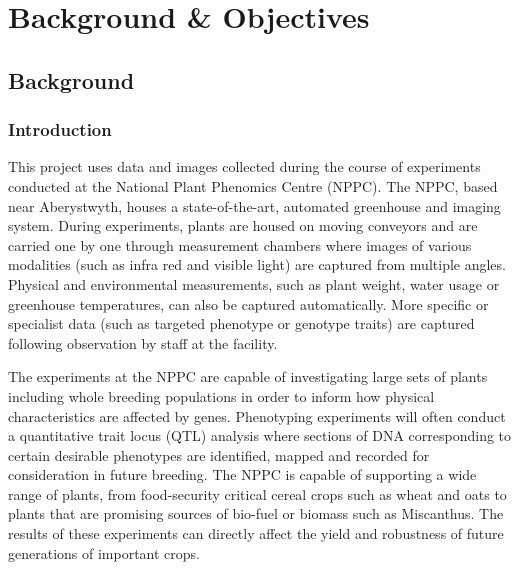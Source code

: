 \chapter{Background \& Objectives}




   
   

\section{Background}
\subsection{Introduction}

This project uses data and images collected during the course of experiments conducted at the National Plant Phenomics Centre (NPPC)\cite{_nppc}. The NPPC, based near Aberystwyth, houses a state-of-the-art, automated greenhouse and imaging system. During experiments, plants are housed on moving conveyors and are carried one by one through measurement chambers where images of various modalities (such as infra red and visible light) are captured from multiple angles. Physical and environmental measurements, such as plant weight, water usage or greenhouse temperatures, can also be captured automatically. More specific or specialist data (such as targeted phenotype or genotype traits) are captured following observation by staff at the facility.

The experiments at the NPPC are capable of investigating large sets of plants including whole breeding populations in order to inform how physical characteristics are affected by genes. Phenotyping experiments will often conduct a quantitative trait locus (QTL) analysis where sections of DNA corresponding to certain desirable phenotypes are identified, mapped and recorded for consideration in future breeding. The NPPC is capable of supporting a wide range of plants, from food-security critical cereal crops such as wheat and oats to plants that are promising sources of bio-fuel or biomass such as Miscanthus. The results of these experiments can directly affect the yield and robustness of future generations of important crops.


